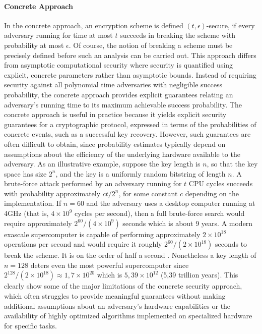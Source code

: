 \paragraph{Concrete Approach}
In the concrete approach, an encryption scheme is defined $(t, \epsilon)$-secure, if every adversary running for time at most $t$ succeeds in breaking the scheme with probability at most $\epsilon$. Of course, the notion of breaking a scheme must be precisely defined before such an analysis can be carried out. This approach differs from asymptotic computational security where security is quantified using explicit, concrete parameters rather than asymptotic bounds. Instead of requiring security against all polynomial time adversaries with negligible success probability, the concrete approach provides explicit guarantees relating an adversary’s running time to its maximum achievable success probability. The concrete approach is useful in practice because it yields explicit security guarantees for a cryptographic protocol, expressed in terms of the probabilities of concrete events, such as a successful key recovery. However, such guarantees are often difficult to obtain, since probability estimates typically depend on assumptions about the efficiency of the underlying hardware available to the adversary. As an illustrative example, suppose the key length is $n$, so that the key space has size $2^n$, and the key is a uniformly random bitstring of length 
$n$. A brute-force attack performed by an adversary running for $t$ CPU cycles succeeds with probability approximately $ct/2^n$, for some constant $c$ depending on the implementation. If 
$n=60$ and the adversary uses a desktop computer running at 4GHz (that is, $4\times10^9$ cycles per second), then a full brute-force search would require approximately $2^{60}/(4 \times 10^9)$ seconds which is about 9 years. A modern exascale supercomputer is capable of performing approximately $2 \times 10^{18}$ operations per second and would require it roughly $2^{60}/(2 \times 10^{18})$ seconds to break the scheme. It is on the order of half a second \cite{introduction-to-modern-cryptography}. Nonetheless a key length of $n=128$ deters even the most powerful supercomputer since $2^{128}/(2 \times 10^{18}) \approx 1,7 \times 10^{20}$ which is $5,39 \times 10^{12}$ (5,39 trillion years). This clearly show some of the major limitations of the concrete security approach, which often struggles to provide meaningful guarantees without making additional assumptions about an adversary’s hardware capabilities or the availability of highly optimized algorithms implemented on specialized hardware for specific tasks.

